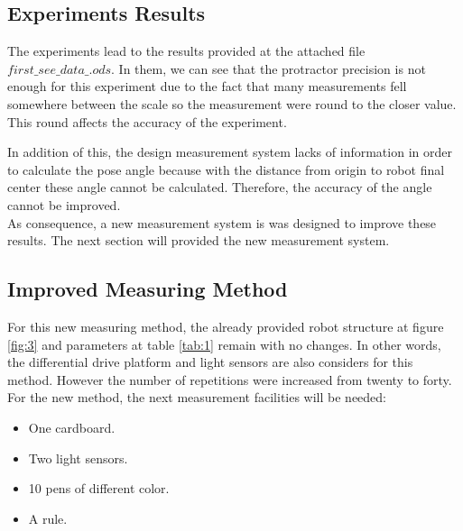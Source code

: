 \documentclass[10pt]{scrartcl}
\begin{document}
\subsection*{Experiments Results}

The experiments lead to the results provided at the attached file $first\_see\_data\_.ods$. In them, we can see that the  protractor precision is not enough for this experiment due to the fact that many measurements fell somewhere between the scale so the measurement were round to the closer value. This round affects the accuracy of the experiment.

In addition of this, the design measurement system lacks of information in order to calculate the pose angle because with the distance from origin to robot final center these angle cannot be calculated. Therefore, the accuracy of the angle cannot be improved. \\

As consequence, a new measurement system is was designed to improve these results. The next section will provided the new measurement system.

\subsection*{Improved Measuring Method}

For this new measuring method, the already provided robot structure at figure \ref{fig:3} and parameters at table \ref{tab:1} remain with no changes. In other words, the differential drive platform and light sensors are also considers for this method. However the number of repetitions were increased from twenty to forty.\\

For the new method, the next measurement facilities will be needed:

\begin{itemize}
	\item One cardboard.
	\item Two light sensors.
	\item 10 pens of different color.
	\item A rule.
\end{itemize}
\end{document}
